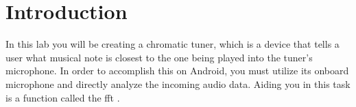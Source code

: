 \section{Introduction}

In this lab you will be creating a chromatic tuner, which is a device that tells a user what musical note is closest to the one being played into the tuner's microphone.
In order to accomplish this on Android, you must utilize its onboard microphone and directly analyze the incoming audio data.
Aiding you in this task is a function called the \ac{fft} .
